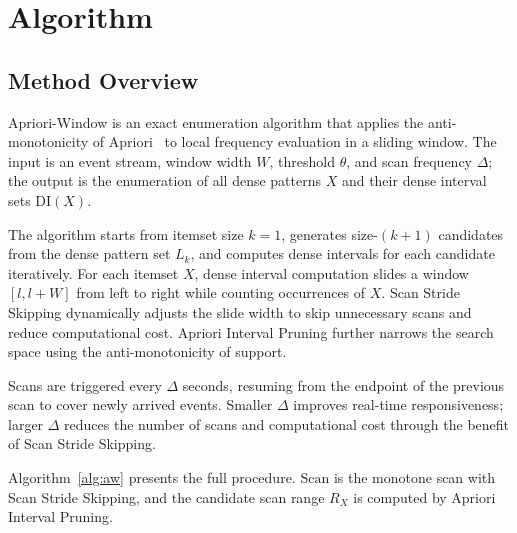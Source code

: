 \section{Algorithm}

\subsection{Method Overview}

Apriori-Window is an exact enumeration algorithm that applies the
anti-monotonicity of Apriori~\cite{agrawal1994fast} to local frequency
evaluation in a sliding window.
The input is an event stream, window width $W$, threshold $\theta$,
and scan frequency $\Delta$; the output is the enumeration of all
dense patterns $X$ and their dense interval sets $\mathrm{DI}(X)$.

The algorithm starts from itemset size $k = 1$,
generates size-$(k{+}1)$ candidates from the dense pattern set $L_k$,
and computes dense intervals for each candidate iteratively.
For each itemset $X$, dense interval computation slides a window
$[l, l{+}W]$ from left to right while counting occurrences of $X$.
Scan Stride Skipping dynamically adjusts the slide width to skip
unnecessary scans and reduce computational cost.
Apriori Interval Pruning further narrows the search space using
the anti-monotonicity of support.

Scans are triggered every $\Delta$ seconds, resuming from the
endpoint of the previous scan to cover newly arrived events.
Smaller $\Delta$ improves real-time responsiveness; larger $\Delta$
reduces the number of scans and computational cost through the
benefit of Scan Stride Skipping.

Algorithm~\ref{alg:aw} presents the full procedure.
$\mathrm{Scan}$ is the monotone scan with Scan Stride Skipping,
and the candidate scan range $R_X$ is computed by Apriori Interval Pruning.

